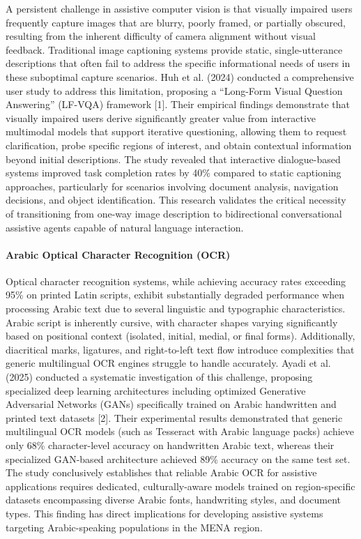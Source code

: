 \documentclass[12pt,a4paper]{report}
\begin{document}
A persistent challenge in assistive computer vision is that visually impaired users frequently capture images that are blurry, poorly framed, or partially obscured, resulting from the inherent difficulty of camera alignment without visual feedback. Traditional image captioning systems provide static, single-utterance descriptions that often fail to address the specific informational needs of users in these suboptimal capture scenarios. Huh et al. (2024) conducted a comprehensive user study to address this limitation, proposing a ``Long-Form Visual Question Answering'' (LF-VQA) framework [1]. Their empirical findings demonstrate that visually impaired users derive significantly greater value from interactive multimodal models that support iterative questioning, allowing them to request clarification, probe specific regions of interest, and obtain contextual information beyond initial descriptions. The study revealed that interactive dialogue-based systems improved task completion rates by 40\% compared to static captioning approaches, particularly for scenarios involving document analysis, navigation decisions, and object identification. This research validates the critical necessity of transitioning from one-way image description to bidirectional conversational assistive agents capable of natural language interaction.

\paragraph*{Arabic Optical Character Recognition (OCR)}

Optical character recognition systems, while achieving accuracy rates exceeding 95\% on printed Latin scripts, exhibit substantially degraded performance when processing Arabic text due to several linguistic and typographic characteristics. Arabic script is inherently cursive, with character shapes varying significantly based on positional context (isolated, initial, medial, or final forms). Additionally, diacritical marks, ligatures, and right-to-left text flow introduce complexities that generic multilingual OCR engines struggle to handle accurately. Ayadi et al. (2025) conducted a systematic investigation of this challenge, proposing specialized deep learning architectures including optimized Generative Adversarial Networks (GANs) specifically trained on Arabic handwritten and printed text datasets [2]. Their experimental results demonstrated that generic multilingual OCR models (such as Tesseract with Arabic language packs) achieve only 68\% character-level accuracy on handwritten Arabic text, whereas their specialized GAN-based architecture achieved 89\% accuracy on the same test set. The study conclusively establishes that reliable Arabic OCR for assistive applications requires dedicated, culturally-aware models trained on region-specific datasets encompassing diverse Arabic fonts, handwriting styles, and document types. This finding has direct implications for developing assistive systems targeting Arabic-speaking populations in the MENA region.
\end{document}
